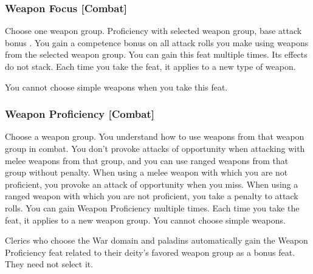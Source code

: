 
\subsubsection{Weapon Focus [Combat]}
Choose one weapon group.
 Proficiency with selected weapon group, base attack bonus .
 You gain a  competence bonus on all attack rolls you make using weapons from the selected weapon group.
 You can gain this feat multiple times. Its effects do not stack. Each time you take the feat, it applies to a new type of weapon.
\par You cannot choose simple weapons when you take this feat.

\subsubsection{Weapon Proficiency [Combat]}
Choose a weapon group. You understand how to use weapons from that weapon group in combat.
 You don't provoke attacks of opportunity when attacking with melee weapons from that group, and you can use ranged weapons from that group without penalty.
 When using a melee weapon with which you are not proficient, you provoke an attack of opportunity when you miss. When using a ranged weapon with which you are not proficient, you take a  penalty to attack rolls.
 You can gain Weapon Proficiency multiple times. Each time you take the feat, it applies to a new weapon group. You cannot choose simple weapons.
\par Clerics who choose the War domain and paladins automatically gain the Weapon Proficiency feat related to their deity's favored weapon group as a bonus feat. They need not select it.

